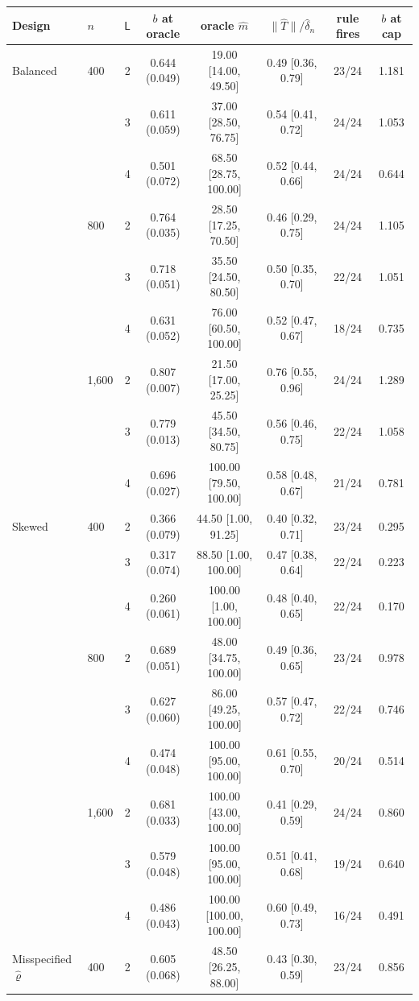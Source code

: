 \begin{tabular}{llcccccc}
\toprule
Design & $n$ & $\mathsf L$ & $b$ at oracle & oracle $\hat m$ & $\|\hat T\|/\hat\delta_n$ & rule fires & $b$ at cap \\
\midrule
Balanced & 400 & 2 & 0.644 (0.049) & 19.00 [14.00, 49.50] & 0.49 [0.36, 0.79] & 23/24 & 1.181 \\
 &  & 3 & 0.611 (0.059) & 37.00 [28.50, 76.75] & 0.54 [0.41, 0.72] & 24/24 & 1.053 \\
 &  & 4 & 0.501 (0.072) & 68.50 [28.75, 100.00] & 0.52 [0.44, 0.66] & 24/24 & 0.644 \\
 & 800 & 2 & 0.764 (0.035) & 28.50 [17.25, 70.50] & 0.46 [0.29, 0.75] & 24/24 & 1.105 \\
 &  & 3 & 0.718 (0.051) & 35.50 [24.50, 80.50] & 0.50 [0.35, 0.70] & 22/24 & 1.051 \\
 &  & 4 & 0.631 (0.052) & 76.00 [60.50, 100.00] & 0.52 [0.47, 0.67] & 18/24 & 0.735 \\
 & 1,600 & 2 & 0.807 (0.007) & 21.50 [17.00, 25.25] & 0.76 [0.55, 0.96] & 24/24 & 1.289 \\
 &  & 3 & 0.779 (0.013) & 45.50 [34.50, 80.75] & 0.56 [0.46, 0.75] & 22/24 & 1.058 \\
 &  & 4 & 0.696 (0.027) & 100.00 [79.50, 100.00] & 0.58 [0.48, 0.67] & 21/24 & 0.781 \\
\addlinespace
Skewed & 400 & 2 & 0.366 (0.079) & 44.50 [1.00, 91.25] & 0.40 [0.32, 0.71] & 23/24 & 0.295 \\
 &  & 3 & 0.317 (0.074) & 88.50 [1.00, 100.00] & 0.47 [0.38, 0.64] & 22/24 & 0.223 \\
 &  & 4 & 0.260 (0.061) & 100.00 [1.00, 100.00] & 0.48 [0.40, 0.65] & 22/24 & 0.170 \\
 & 800 & 2 & 0.689 (0.051) & 48.00 [34.75, 100.00] & 0.49 [0.36, 0.65] & 23/24 & 0.978 \\
 &  & 3 & 0.627 (0.060) & 86.00 [49.25, 100.00] & 0.57 [0.47, 0.72] & 22/24 & 0.746 \\
 &  & 4 & 0.474 (0.048) & 100.00 [95.00, 100.00] & 0.61 [0.55, 0.70] & 20/24 & 0.514 \\
 & 1,600 & 2 & 0.681 (0.033) & 100.00 [43.00, 100.00] & 0.41 [0.29, 0.59] & 24/24 & 0.860 \\
 &  & 3 & 0.579 (0.048) & 100.00 [95.00, 100.00] & 0.51 [0.41, 0.68] & 19/24 & 0.640 \\
 &  & 4 & 0.486 (0.043) & 100.00 [100.00, 100.00] & 0.60 [0.49, 0.73] & 16/24 & 0.491 \\
\addlinespace
Misspecified $\hat\varrho$ & 400 & 2 & 0.605 (0.068) & 48.50 [26.25, 88.00] & 0.43 [0.30, 0.59] & 23/24 & 0.856 \\

\end{tabular}
